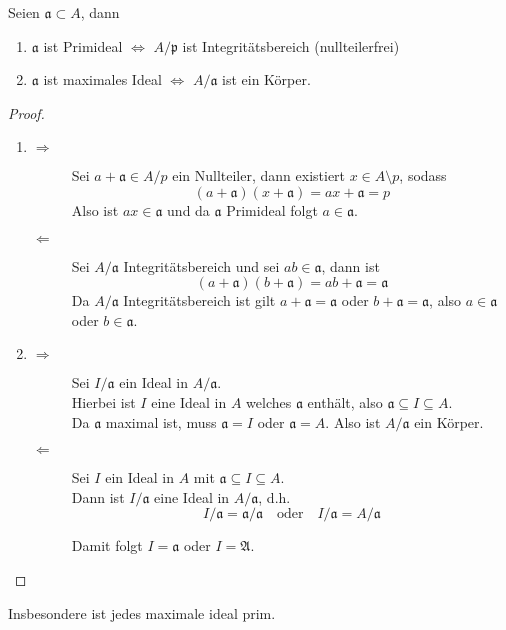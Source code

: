 	\begin{satz}
		Seien $\mathfrak a\subset A$, dann
		\begin{enumerate}
			\item $\mathfrak a$ ist Primideal $\Leftrightarrow$ $A/\mathfrak p$ ist Integritätsbereich (nullteilerfrei)
			\item $\mathfrak a$ ist maximales Ideal $\Leftrightarrow$ $A/\mathfrak a$ ist ein Körper.
		\end{enumerate}
	\end{satz}
	\begin{proof}
		\begin{enumerate}
			\item \begin{description}
				\item[$\Rightarrow$] Sei $a+\mathfrak a\in A/p$ ein Nullteiler, dann existiert $x\in A\setminus p$, sodass
				\[(a+\mathfrak a)(x+\mathfrak a)=ax+\mathfrak a=p\]
				Also ist $ax\in \mathfrak a$ und da $\mathfrak a$ Primideal folgt $a\in\mathfrak a$.
				\item[$\Leftarrow$] Sei $A/\mathfrak a$ Integritätsbereich und sei $ab\in\mathfrak a$, dann ist
				\[(a+\mathfrak a)(b+\mathfrak a)=ab+\mathfrak a=\mathfrak a\]
				Da $A/\mathfrak a$ Integritätsbereich ist gilt $a+\mathfrak a=\mathfrak a$ oder $b+\mathfrak a=\mathfrak a$, also $a\in\mathfrak a$ oder $b\in\mathfrak a$.
			\end{description}
			\item \begin{description}
				\item[$\Rightarrow$] Sei $I/\mathfrak a$ ein Ideal in $A/\mathfrak a$.\\
				Hierbei ist $I$ eine Ideal in $A$ welches $\mathfrak a$ enthält, also $\mathfrak a\subseteq I\subseteq A$.\\
				Da $\mathfrak a$ maximal ist, muss $\mathfrak a=I$ oder $\mathfrak a=A$. Also ist $A/\mathfrak a$ ein Körper.
				\item[$\Leftarrow$] Sei $I$ ein Ideal in $A$ mit $\mathfrak a\subseteq I\subseteq A$.\\
				Dann ist $I/\mathfrak a$ eine Ideal in $A/\mathfrak a$, d.h.
				\[I/\mathfrak a=\mathfrak a/\mathfrak a\quad\text{oder}\quad I/\mathfrak a=A/\mathfrak a\]
				
				Damit folgt $I=\mathfrak a$ oder $I=\mathfrak A$.
			\end{description}
		\end{enumerate}
	\end{proof}
	\begin{bem*}
		Insbesondere ist jedes maximale ideal prim.
	\end{bem*}

